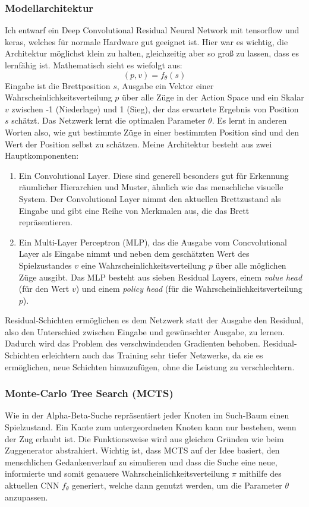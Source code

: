 \documentclass{jpp}
\begin{document}
\subsubsection{Modellarchitektur}
Ich entwarf ein Deep Convolutional Residual Neural Network mit tensorflow und keras, welches für normale Hardware gut geeignet ist. Hier war es wichtig, die Architektur möglichst klein zu halten, gleichzeitig aber so groß zu lassen, dass es lernfähig ist. Mathematisch sieht es wiefolgt aus:
\[(p, v) =  f_\theta(s)\]Eingabe ist die Brettposition $s$, Ausgabe ein Vektor einer Wahrscheinlichkeitsverteilung $p$ über alle Züge in der Action Space und ein Skalar $v$ zwischen -1 (Niederlage) und 1 (Sieg), der das erwartete Ergebnis von Position $s$ schätzt. Das Netzwerk lernt die optimalen Parameter $\theta$. Es lernt in anderen Worten also, wie gut bestimmte Züge in einer bestimmten Position sind und den Wert der Position selbst zu schätzen. 
Meine Architektur besteht aus zwei Hauptkomponenten:
\begin{enumerate}
\item Ein Convolutional Layer. Diese sind generell besonders gut für Erkennung räumlicher Hierarchien und Muster, ähnlich wie das menschliche visuelle System. Der Convolutional Layer nimmt den aktuellen Brettzustand als Eingabe und gibt eine Reihe von Merkmalen aus, die das Brett repräsentieren.
\item Ein Multi-Layer Perceptron (MLP), das die Ausgabe vom Concvolutional Layer als Eingabe nimmt und neben dem geschätzten Wert des Spielzustandes $v$ eine Wahrscheinlichkeitsverteilung $p$ über alle möglichen Züge ausgibt. Das MLP besteht aus sieben Residual Layers, einem \textit{value head} (für den Wert $v$) und einem \textit{policy head} (für die Wahrscheinlichkeitsverteilung $p$). 
\end{enumerate}
Residual-Schichten ermöglichen es dem Netzwerk statt der Ausgabe den Residual, also den Unterschied zwischen Eingabe und gewünschter Ausgabe, zu lernen. Dadurch wird das Problem des verschwindenden Gradienten behoben. Residual-Schichten erleichtern auch das Training sehr tiefer Netzwerke, da sie es ermöglichen, neue Schichten hinzuzufügen, ohne die Leistung zu verschlechtern. 
\subsubsection{Monte-Carlo Tree Search (MCTS)}
Wie in der Alpha-Beta-Suche repräsentiert jeder Knoten im Such-Baum einen Spielzustand. Ein Kante zum untergeordneten Knoten kann nur bestehen, wenn der Zug erlaubt ist. 
Die Funktionsweise wird aus gleichen Gründen wie beim Zuggenerator abstrahiert. Wichtig ist, dass MCTS auf der Idee basiert, den menschlichen Gedankenverlauf zu simulieren und dass die Suche eine neue, informierte und somit genauere Wahrscheinlichkeitsverteilung $\pi$ mithilfe des aktuellen CNN $f_\theta$  generiert, welche dann genutzt werden, um die Parameter $\theta$ anzupassen.
\end{document}
